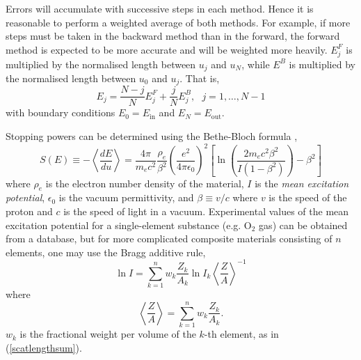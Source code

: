 \documentclass[preprint,times]{elsarticle}
\newcommand{\Eqn}[1]{(#1)} %
\begin{document}
Errors will accumulate with successive steps in each method. Hence it is reasonable to perform a weighted average of both methods. For example, if more steps must be taken in the backward method than in the forward, the forward method is expected to be more accurate and will be weighted more heavily. $E_j^F$ is multiplied by the normalised length between $u_j$ and $u_N$, while $E^B$ is multiplied by the normalised length between $u_0$ and $u_j$. That is,
\begin{equation}
E_j = \frac{N-j}{N}E_j^F + \frac{j}{N}E_j^B, \ \ \ j=1,\dots,N-1 \label{eulercombo}
\end{equation}
with boundary conditions $E_0=E_\mathrm{in}$ and $E_N = E_\mathrm{out}$.

Stopping powers can be determined using the Bethe-Bloch formula \citep{betheashkin},
\begin{equation}
S(E) \equiv -\left\langle \frac{dE}{du} \right\rangle = \frac{4\pi}{m_ec^2}\frac{\rho_e}{\beta^2}\left( \frac{e^2}{4\pi\epsilon_0}\right)^2\left[ \ln\left( \frac{2m_ec^2\beta^2}{I(1-\beta^2)}\right)-\beta^2 \right] \label{bethebloch}
\end{equation}
where $\rho_e$ is the electron number density of the material, $I$ is the \emph{mean excitation potential}, $\epsilon_0$ is the vacuum permittivity, and $\beta \equiv v/c$ where $v$ is the speed of the proton and $c$ is the speed of light in a vacuum. Experimental values of the mean excitation potential for a single-element substance (e.g. O$_2$ gas) can be obtained from a database, but for more complicated composite materials consisting of $n$ elements, one may use the Bragg additive rule,
\begin{equation}
\ln I = \sum_{k=1}^n w_k \frac{Z_k}{A_k} \ln I_k \left\langle \frac{Z}{A} \right\rangle^{-1} \label{additiverule}
\end{equation}
where
\begin{equation}
\left\langle \frac{Z}{A} \right\rangle = \sum_{k=1}^n w_k \frac{Z_k}{A_k}.
\end{equation}
$w_k$ is the fractional weight per volume of the $k$-th element, as in \Eqn{\ref{scatlengthsum}}.
\end{document}
